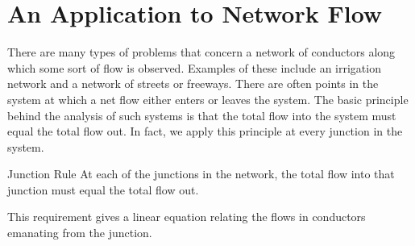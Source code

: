 \section{An Application to Network Flow}
\label{sec:1_4}

There are many types of problems that concern a network of conductors along which some sort of flow is observed. Examples of these include an irrigation network and a network of streets or freeways. There are often points in the system at which a net flow either enters or leaves the system. The basic principle behind the analysis of such systems is that the total flow into the system must equal the total flow out. In fact, we apply this principle at every junction in the system.

\begin{theorem*}[label=thm:001735]{Junction Rule}
At each of the junctions in the network, the total flow into that junction must equal the total flow out.
\end{theorem*}

\noindent This requirement gives a linear equation relating the flows in conductors emanating from the junction.

